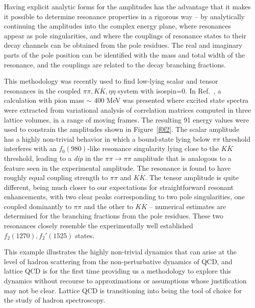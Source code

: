 Having explicit analytic forms for the amplitudes has the advantage that it makes it possible to determine resonance properties in a rigorous way -- by analytically continuing the amplitudes into the complex energy plane, where resonances appear as pole singularities, and where the couplings of resonance states to their decay channels can be obtained from the pole residues. The real and imaginary parts of the pole position can be identified with the mass and total width of the resonance, and the couplings are related to the decay branching fractions.

This methodology was recently used to find low-lying scalar and tensor resonances in the coupled $\pi\pi, K\overline{K}, \eta\eta$ system with isospin=0. In Ref.~\cite{Briceno:2017qmb}, a calculation with pion mass $\sim$ 400 MeV was presented where excited state spectra were extracted from variational analysis of correlation matrices computed in three lattice volumes, in a range of moving frames. The resulting 91 energy values were used to constrain the amplitudes shown in Figure~\ref{f0f2}. The scalar amplitude has a highly non-trivial behavior in which a bound-state lying below $\pi\pi$ threshold interferes with an $f_0(980)$-like resonance singularity lying close to the $K\overline{K}$ threshold, leading to a \emph{dip} in the $\pi\pi \to \pi \pi$ amplitude that is analogous to a feature seen in the experimental amplitude. The resonance is found to have roughly equal coupling strength to $\pi\pi$ and $K\overline{K}$. The tensor amplitude is quite different, being much closer to our expectations for straightforward resonant enhancements, with two clear peaks corresponding to two pole singularities, one coupled dominantly to $\pi\pi$ and the other to $K\overline{K}$ -- numerical estimates are determined for the branching fractions from the pole residues. These two resonances closely resemble the experimentally well established $f_2(1270), f_2'(1525)$ states.

This example illustrates the highly non-trivial dynamics that can arise at the level of hadron scattering from the non-perturbative dynamics of QCD, and lattice QCD is for the first time providing us a methodology to explore this dynamics without recourse to approximations or assumptions whose justification may not be clear. Lattice QCD is transitioning into being the tool of choice for the study of hadron spectroscopy.


